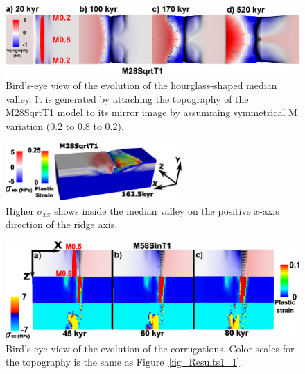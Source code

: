 \documentclass[draft,gc]{agutex}
\begin{document}
\begin{figure}[h]
\noindent\includegraphics[width=1.0\textwidth]{./Figures/fig_Results_3_2_hourglass_evolution.eps}
  \caption[Bird's-eye view of the evolution of the hourglass-shaped median valley.]{Bird's-eye view of the evolution of the hourglass-shaped median valley. It is generated by attaching the topography of the M28SqrtT1 model to its mirror image by assumming symmetrical M variation (0.2 to 0.8 to 0.2). }
 \label{fig_Results_3_2_hourglass_evolution}
\end{figure}

\begin{figure}[h]
\noindent\includegraphics[width=0.6\textwidth]{./Figures/fig_Results4_7_sqrt_cut_back_conjugate_Sxx.eps}
  \caption{Higher $\sigma_{xx}$ shows inside the median valley on the positive $x$-axis direction of the ridge axis. }
 \label{fig_Results4_7}
\end{figure}

\begin{figure}[h]
\noindent\includegraphics[width=1.0\textwidth]{./Figures/fig_Results_3_2_6_corrugations_evolution.eps}
  \caption[Bird's-eye view of the evolution of the corrugations.]{Bird's-eye view of the evolution of the corrugations. Color scales for the topography is the same as Figure~\ref{fig_Results1_1}.}
 \label{fig_Results_3_2_6_corrugations_evolution}
\end{figure}
\end{document}
